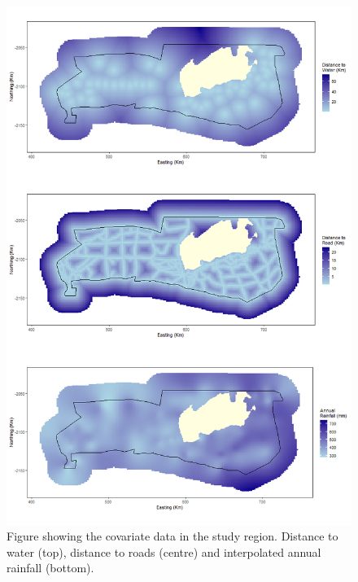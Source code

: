 \begin{figure}[!htb]
\centering
\includegraphics[width=0.9\linewidth]{suppimages/Mike_covardata.png}
\caption{Figure showing the covariate data in the study region. Distance to water (top), distance to roads (centre) and interpolated annual rainfall (bottom).}
\label{fig:covariates}
\end{figure}




